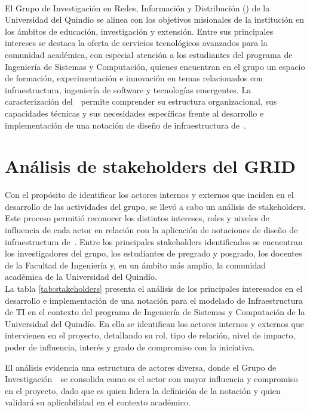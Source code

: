 \label{cap:caracterizacionGRID}
\mbox{}\\
\noindent
El Grupo de Investigación en Redes, Información y Distribución (\GRID) de la Universidad del Quindío se alinea con los objetivos misionales de la institución en los ámbitos de educación, investigación y extensión. Entre sus principales intereses se destaca la oferta de servicios tecnológicos avanzados para la comunidad académica, con especial atención a los estudiantes del programa de Ingeniería de Sistemas y Computación, quienes encuentran en el grupo un espacio de formación, experimentación e innovación en temas relacionados con infraestructura, ingeniería de software y tecnologías emergentes.
La caracterización del~\GRID~permite comprender su estructura organizacional, sus capacidades técnicas y sus necesidades específicas frente al desarrollo e implementación de una notación de diseño de infraestructura de~\TI.

\section{Análisis de stakeholders del GRID}
\noindent
Con el propósito de identificar los actores internos y externos que inciden en el desarrollo de las actividades del grupo, se llevó a cabo un análisis de stakeholders. Este proceso permitió reconocer los distintos intereses, roles y niveles de influencia de cada actor en relación con la aplicación de notaciones de diseño de infraestructura de~\TI. Entre los principales stakeholders identificados se encuentran los investigadores del grupo, los estudiantes de pregrado y posgrado, los docentes de la Facultad de Ingeniería y, en un ámbito más amplio, la comunidad académica de la Universidad del Quindío.
\\
\noindent
La tabla \ref{tab:stakeholders} presenta el análisis de los principales interesados en el desarrollo e implementación de una notación para el modelado de Infraestructura de TI en el contexto del programa de Ingeniería de Sistemas y Computación de la Universidad del Quindío. En ella se identifican los actores internos y externos que intervienen en el proyecto, detallando su rol, tipo de relación, nivel de impacto, poder de influencia, interés y grado de compromiso con la iniciativa.

El análisis evidencia una estructura de actores diversa, donde el Grupo de Investigación~\GRID~se consolida como es el actor con mayor influencia y compromiso en el proyecto, dado que es quien lidera la definición de la notación y quien validará su aplicabilidad en el contexto académico.

